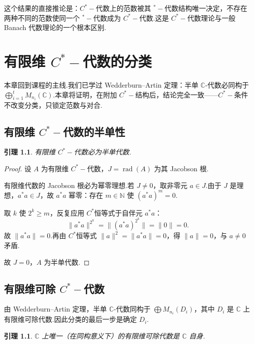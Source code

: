 \documentclass[math-font=lm, text-font=lm, math-style=TeX]{sjtureport}
\newtheorem{lemma}[theorem]{引理}
\theoremstyle{plain}
\newtheorem*{proof}{证明}
\theoremstyle{plain}
\DeclareMathOperator{\rad}{rad}
\begin{document}
这个结果的直接推论是：$C^*-\!$代数上的范数被其 ${}^*-\!$代数结构唯一决定，不存在两种不同的范数使同一个 ${}^*-\!$代数成为 $C^*-\!$代数.这是 $C^*-\!$代数理论与一般 Banach 代数理论的一个根本区别.


\chapter{有限维 $C^*-\!$代数的分类}

本章回到课程的主线.我们已学过 Wedderburn--Artin 定理：半单 $\mathbb{C}$-代数必同构于 $\bigoplus_{i=1}^t M_{n_i}(\mathbb{C})$.本章将证明，在附加 $C^*-\!$结构后，结论完全一致——$C^*-\!$条件不改变分类，只锁定范数与对合.

\section{有限维 $C^*-\!$代数的半单性}



\begin{lemma}\label{lem:semisimple}
    有限维 $C^*-\!$代数必为半单代数.
\end{lemma}

\begin{proof}
    设 $A$ 为有限维 $C^*-\!$代数，$J = \rad(A)$ 为其 Jacobson 根.\par
    有限维代数的 Jacobson 根必为幂零理想.若 $J \neq 0$，取非零元 $a \in J$.由于 $J$ 是理想，$a^*a \in J$，故 $a^*a$ 幂零：存在 $m \in \mathbb{N}$ 使 $(a^*a)^m = 0$.\par
    取 $k$ 使 $2^k \ge m$，反复应用 $C^*$恒等式于自伴元 $a^*a$：
    \[
        \|a^*a\|^{2^k} = \|(a^*a)^{2^k}\| = \|0\| = 0.
    \]
    故 $\|a^*a\| = 0$.再由 $C^*$恒等式 $\|a\|^2 = \|a^*a\| = 0$，得 $\|a\| = 0$，与 $a \neq 0$ 矛盾.\par
    故 $J = 0$，$A$ 为半单代数.
\end{proof}

\section{有限维可除 $C^*-\!$代数}

由 Wedderburn--Artin 定理，半单 $\mathbb{C}$-代数同构于 $\bigoplus M_{n_i}(D_i)$，其中 $D_i$ 是 $\mathbb{C}$ 上有限维可除代数.因此分类的最后一步是确定 $D_i$.

\begin{lemma}\label{lem:division}
    $\mathbb{C}$ 上唯一（在同构意义下）的有限维可除代数是 $\mathbb{C}$ 自身.
\end{lemma}
\end{document}
